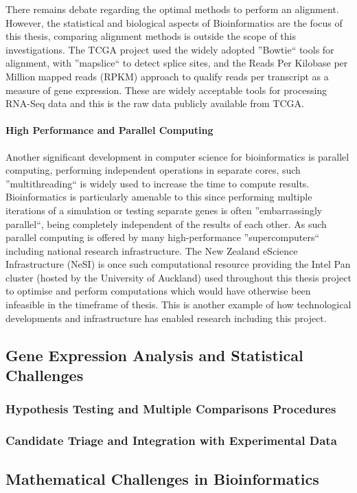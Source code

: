 There remains debate regarding the optimal methods to perform an alignment. However, the statistical and biological aspects of Bioinformatics are the focus of this thesis, comparing alignment methods is outside the scope of this investigations. The TCGA project used the widely adopted ''Bowtie`` tools for alignment, with ''mapslice`` to detect splice sites, and the Reads Per Kilobase per Million mapped reads (RPKM) approach to qualify reads per transcript as a measure of gene expression. These are widely acceptable tools for processing RNA-Seq data and this is the raw data publicly available from TCGA.

\paragraph{High Performance and Parallel Computing}
Another significant development in computer science for bioinformatics is parallel computing, performing independent operations in separate cores, such ''multithreading`` is widely used to increase the time to compute results. Bioinformatics is particularly amenable to this since performing multiple iterations of a simulation or testing separate genes is often ''embarrassingly parallel``, being completely independent of the results of each other. As such parallel computing is offered by many high-performance ''supercomputers`` including national research infrastructure. The New Zealand eScience Infrastructure (NeSI) is once such computational resource providing the Intel Pan cluster (hosted by the University of Auckland) used throughout this thesis project to optimise and perform computations which would have otherwise been infeasible in the timeframe of thesis. This is another example of how technological developments and infrastructure has enabled research including this project.  

\subsection{Gene Expression Analysis and Statistical Challenges}
\subsubsection{Hypothesis Testing and Multiple Comparisons Procedures}
\subsubsection{Candidate Triage and Integration with Experimental Data}
\subsection{Mathematical Challenges in Bioinformatics}
